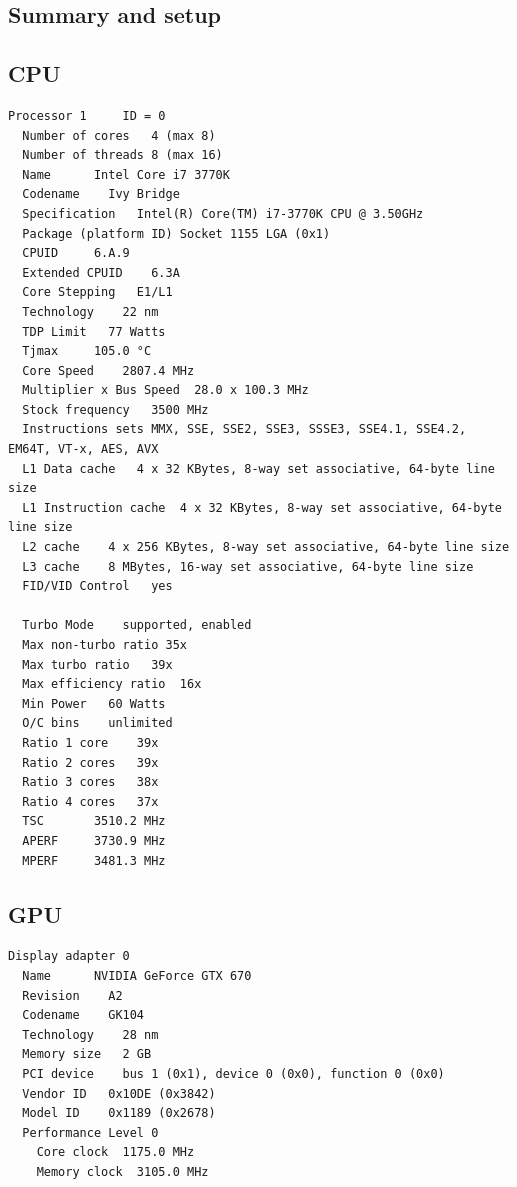 \documentclass[11pt, oneside, a4paper]{article}
\begin{document}
\clearpage
\begin{appendices}
\section{Summary and setup}

\subsection{CPU} %
\label{sub:cpu}

\begin{verbatim}
Processor 1     ID = 0
  Number of cores   4 (max 8)
  Number of threads 8 (max 16)
  Name      Intel Core i7 3770K
  Codename    Ivy Bridge
  Specification   Intel(R) Core(TM) i7-3770K CPU @ 3.50GHz
  Package (platform ID) Socket 1155 LGA (0x1)
  CPUID     6.A.9
  Extended CPUID    6.3A
  Core Stepping   E1/L1
  Technology    22 nm
  TDP Limit   77 Watts
  Tjmax     105.0 °C
  Core Speed    2807.4 MHz
  Multiplier x Bus Speed  28.0 x 100.3 MHz
  Stock frequency   3500 MHz
  Instructions sets MMX, SSE, SSE2, SSE3, SSSE3, SSE4.1, SSE4.2, EM64T, VT-x, AES, AVX
  L1 Data cache   4 x 32 KBytes, 8-way set associative, 64-byte line size
  L1 Instruction cache  4 x 32 KBytes, 8-way set associative, 64-byte line size
  L2 cache    4 x 256 KBytes, 8-way set associative, 64-byte line size
  L3 cache    8 MBytes, 16-way set associative, 64-byte line size
  FID/VID Control   yes

  Turbo Mode    supported, enabled
  Max non-turbo ratio 35x
  Max turbo ratio   39x
  Max efficiency ratio  16x
  Min Power   60 Watts
  O/C bins    unlimited
  Ratio 1 core    39x
  Ratio 2 cores   39x
  Ratio 3 cores   38x
  Ratio 4 cores   37x
  TSC       3510.2 MHz
  APERF     3730.9 MHz
  MPERF     3481.3 MHz
\end{verbatim}

\clearpage

\subsection{GPU} %
\label{sub:gpu}
\begin{verbatim}
Display adapter 0 
  Name      NVIDIA GeForce GTX 670
  Revision    A2
  Codename    GK104
  Technology    28 nm
  Memory size   2 GB
  PCI device    bus 1 (0x1), device 0 (0x0), function 0 (0x0)
  Vendor ID   0x10DE (0x3842)
  Model ID    0x1189 (0x2678)
  Performance Level 0
    Core clock  1175.0 MHz
    Memory clock  3105.0 MHz


\end{verbatim}
\end{appendices}
\end{document}
